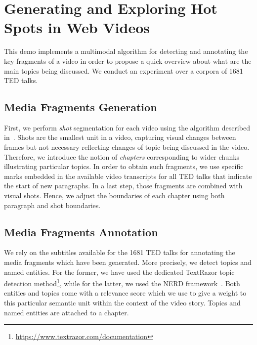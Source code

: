 \documentclass{llncs}
\begin{document}

\section{Generating and Exploring Hot Spots in Web Videos}
\label{sec:hotspots}
This demo implements a multimodal algorithm for detecting and annotating the key fragments of a video in order to propose a quick overview about what are the main topics being discussed. We conduct an experiment over a corpora of 1681 TED talks.

\subsection{Media Fragments Generation}
\label{sec:fragments-generation}
First, we perform \emph{shot} segmentation for each video using the algorithm described in~\cite{sidiropoulos2011temporal}. Shots are the smallest unit in a video, capturing visual changes between frames but not necessary reflecting changes of topic being discussed in the video. Therefore, we introduce the notion of \emph{chapters} corresponding to wider chunks illustrating particular topics. In order to obtain such fragments, we use specific marks embedded in the available video transcripts for all TED talks that indicate the start of new paragraphs. In a last step, those fragments are combined with visual shots. Hence, we adjust the boundaries of each chapter using both paragraph and shot boundaries.

\subsection{Media Fragments Annotation}
\label{sec:fragments-annotation}
We rely on the subtitles available for the 1681 TED talks for annotating the media fragments which have been generated. More precisely, we detect topics and named entities. For the former, we have used the dedicated TextRazor topic detection method\footnote{\url{https://www.textrazor.com/documentation}}, while for the latter, we used the NERD framework~\cite{Rizzo2012b}. Both entities and topics come with a relevance score which we use to give a weight to this particular semantic unit within the context of the video story. Topics and named entities are attached to a chapter.
\end{document}
